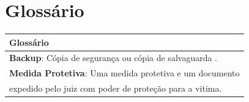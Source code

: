 \documentclass[
	12pt,				%
    oneside,			%
	a4paper,			%
	english,			%
	french,				%
	spanish,			%
	brazil,				%
	]{abntex2}
\begin{document}
			\section{Glossário}
	
				\begin{center}
				
				\begin{tabular}{|l|}
					
					\hline
			\textbf{Glossário}	  
					\\ \hline
					\textbf{Backup}: Cópia de segurança ou cópia de salvaguarda
					 .                                                                   \\ \hline
					
					\textbf{Medida Protetiva}: Uma medida protetiva e um documento                                      \\ 
					expedido pelo juiz com poder de proteção para a vitima.                           
					\\ \hline
				\end{tabular}
				
			\end{center}


\postextual




%

\clearpage


\begin{apendicesenv}

\partapendices




\end{apendicesenv}
\end{document}
